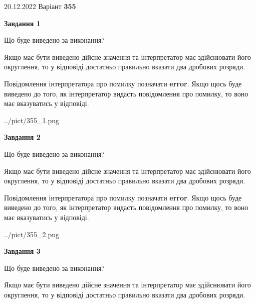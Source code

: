 \documentclass[12pt, ukrainian]{article}
\begin{document}
{20.12.2022 Варіант \No \textbf { 355 }\par}
{
\begin {Large}

{\begin {center}\textbf{Завдання 1}\end {center}}\par
Що буде виведено за виконання? \par

Якщо має бути виведено дійсне значення та інтерпретатор має здійснювати його округлення, 
то у відповіді достатньо правильно вказати два дробових розряди.

Повідомлення інтерпретатора про помилку позначати \textbf{error}.
Якщо щось буде виведено до того, як інтерпретатор видасть повідомлення про помилку, 
то воно має вказуватись у відповіді. \par

\begin{center}
	{../pict/355_1.png}
\end{center}
\newpage

{\begin {center}\textbf{Завдання 2}\end {center}}\par
Що буде виведено за виконання? \par

Якщо має бути виведено дійсне значення та інтерпретатор має здійснювати його округлення, 
то у відповіді достатньо правильно вказати два дробових розряди.

Повідомлення інтерпретатора про помилку позначати \textbf{error}.
Якщо щось буде виведено до того, як інтерпретатор видасть повідомлення про помилку, 
то воно має вказуватись у відповіді. \par

\begin{center}
	{../pict/355_2.png}
\end{center}
\newpage

{\begin {center}\textbf{Завдання 3}\end {center}}\par
Що буде виведено за виконання? \par

Якщо має бути виведено дійсне значення та інтерпретатор має здійснювати його округлення, 
то у відповіді достатньо правильно вказати два дробових розряди.


\end{Large}}
\end{document}
